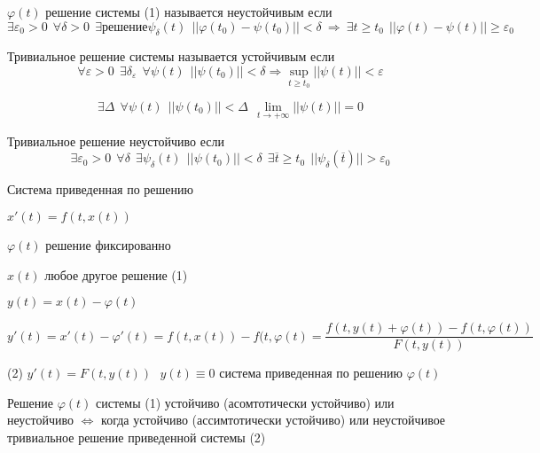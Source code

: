 \begin{define}
  $\varphi(t)$ решение системы (1) называется неустойчивым если
  $$
  \exists \varepsilon_0 > 0 ~~ \forall \delta > 0 ~~ \exists \text{решение}
  \psi_{\delta}(t) ~~ ||\varphi(t_0) - \psi(t_0)|| < \delta ~ \Rightarrow ~
  \exists t \ge t_0 ~~ || \varphi(t) - \psi(t)|| \ge \varepsilon_0
  $$
\end{define}

\begin{define}
  Тривиальное решение системы называется устойчивым если
  $$
  \forall \varepsilon > 0 ~~ \exists \delta_{\varepsilon} ~~ \forall \psi(t) ~~
  ||\psi(t_0)|| < \delta \Rightarrow \sup_{t \ge t_0} ||\psi(t)|| < \varepsilon
  $$
\end{define}

\begin{define}
  $$
  \exists \Delta ~~ \forall \psi(t) ~~ ||\psi(t_0)|| < \Delta ~~
  \lim_{t \to + \infty} ||\psi(t)|| = 0
  $$
\end{define}

\begin{define}
  Тривиальное решение неустойчиво если
  $$
  \exists \varepsilon_0 > 0 ~~ \forall \delta ~~ \exists \psi_{\delta}(t) ~~
  ||\psi(t_0)|| < \delta ~~ \exists \overline{t} \ge t_0 ~~
  ||\psi_{\delta}(\overline{t})|| > \varepsilon_0
  $$
\end{define}

\begin{title}[\Large]
  Система приведенная по решению
\end{title}

$x'(t) = f(t, x(t))$

$\varphi(t)$ решение фиксированно

$x(t)$ любое другое решение (1)

$y(t) = x(t) - \varphi(t)$

$$
y'(t) = x'(t) - \varphi'(t) = f(t, x(t)) - f(t, \varphi(t) = \frac{f(t, y(t) +
\varphi(t)) - f(t, \varphi(t))}{F(t, y(t))}
$$

(2) $y'(t) = F(t, y(t)) ~~~ y(t) \equiv 0$ система приведенная по решению
$\varphi(t)$

\begin{block}[Утверждение]
  Решение $\varphi(t)$ системы (1) устойчиво (асомтотически устойчиво) или
  неустойчиво $\Leftrightarrow$ когда устойчиво (ассимтотически устойчиво) или
  неустойчивое тривиальное решение приведенной системы (2)
\end{block}

